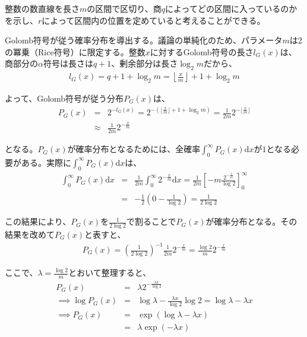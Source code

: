 \documentclass[uplatex,dvipdfmx,b5j,10pt]{jsbook}
\theoremstyle{definition}
\begin{document}
整数の数直線を長さ$m$の区間で区切り、商$q$によってどの区間に入っているのかを示し、$r$によって区間内の位置を定めていると考えることができる。

Golomb符号が従う確率分布を導出する。議論の単純化のため、パラメータ$m$は2の冪乗（Rice符号）に限定する。整数$x$に対するGolomb符号の長さ$l_{G}(x)$は、商部分の$\alpha$符号は長さは$q+1$、剰余部分は長さ$\log_{2} m$だから、
\begin{eqnarray*}
  l_{G}(x) = q + 1 + \log_{2} m = \left\lfloor \frac{x}{m} \right\rfloor + 1 + \log_{2} m
\end{eqnarray*}

よって、Golomb符号が従う分布$P_{G}(x)$は、
\begin{eqnarray*}
  P_{G}(x) &=& 2^{-l_{G}(x)} = 2^{-\left( \lfloor \frac{x}{m} \rfloor + 1 + \log_{2} m \right)} = \frac{1}{2m} 2^{-\lfloor \frac{x}{m} \rfloor} \nonumber \\
  &\approx& \frac{1}{2m} 2^{-\frac{x}{m}}
\end{eqnarray*}

となる。$P_{G}(x)$が確率分布となるためには、全確率$\int^{\infty}_{0} P_{G}(x) \textrm{d}x$が$1$となる必要がある。実際に$\int^{\infty}_{0} P_{G}(x) \textrm{d}x$は、
\begin{eqnarray*}
  \int^{\infty}_{0} P_{G}(x) \textrm{d}x &=& \frac{1}{2m} \int^{\infty}_{0} 2^{-\frac{x}{m}} \textrm{d}x = \frac{1}{2m} \left[ -m \frac{2^{-\frac{x}{m}}}{\log 2} \right]^{\infty}_{0} \\
  &=& -\frac{1}{2} \left( 0 - \frac{1}{\log 2} \right) = \frac{1}{2 \log 2}
\end{eqnarray*}

この結果により、$P_{G}(x)$を$\frac{1}{2 \log 2}$で割ることで$P_{G}(x)$が確率分布となる。その結果を改めて$P_{G}(x)$と表すと、
\begin{eqnarray*}
  P_{G}(x) = \left( \frac{1}{2 \log 2} \right)^{-1} \frac{1}{2m} 2^{-\frac{x}{m}} = \frac{\log 2}{m} 2^{-\frac{x}{m}}
\end{eqnarray*}

ここで、$\lambda = \frac{\log 2}{m}$とおいて整理すると、
\begin{eqnarray}
  P_{G}(x) &=& \lambda 2^{-\frac{\lambda x}{\log 2}} \nonumber \\
  \implies \log P_{G}(x) &=& \log \lambda - \frac{\lambda x}{\log 2} \log 2 = \log \lambda - \lambda x \nonumber \\
  \implies P_{G}(x) &=& \exp \left( \log \lambda - \lambda x \right) \nonumber \\
  &=& \lambda \exp(- \lambda x) \label{golomb_code_is_exp_distribution}
\end{eqnarray}
\end{document}
